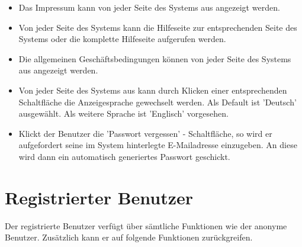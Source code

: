 \documentclass[a4paper]{scrreprt}
\newcounter{Lc}
\newcounter{Hc}
\newcommand{\stepHc}{\stepcounter{Hc}\setcounter{Lc}{0}}
\begin{document}
\begin{itemize}
	\item {}
	Das Impressum kann von jeder Seite des Systems aus angezeigt werden.
	\item {}
	Von jeder Seite des Systems kann die Hilfeseite zur entsprechenden Seite des Systems oder die komplette Hilfeseite aufgerufen werden.
	\item {}
	Die allgemeinen Geschäftsbedingungen können von jeder Seite des Systems aus angezeigt werden.
	\item {}
	Von jeder Seite des Systems aus kann durch Klicken einer entsprechenden Schaltfläche die Anzeigesprache gewechselt werden. Als Default ist 'Deutsch' ausgewählt. Als weitere Sprache ist 'Englisch' vorgesehen. 
	\item {}
	Klickt der Benutzer die 'Passwort vergessen' - Schaltfläche, so wird er aufgefordert seine im System hinterlegte E-Mailadresse einzugeben. An diese wird dann ein automatisch generiertes Passwort geschickt.
\end{itemize}

\section{Registrierter Benutzer}
Der registrierte Benutzer verfügt über sämtliche Funktionen wie der anonyme Benutzer. Zusätzlich kann er auf folgende Funktionen zurückgreifen.
\stepHc
\end{document}
